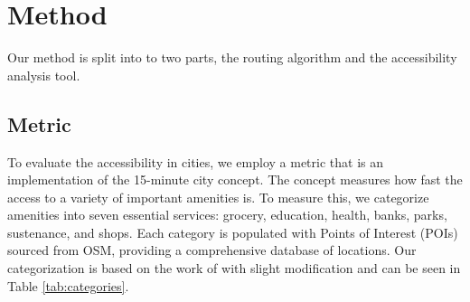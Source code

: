 \clearpage
\section{Method}
\label{sec:method}

Our method is split into to two parts, the routing algorithm and the accessibility analysis tool.

\subsection{Metric}
\label{subsec:metric}

To evaluate the accessibility in cities, we employ a metric that is an implementation of the 15-minute city concept. The concept measures how fast the access to a variety of important amenities is.
To measure this, we categorize amenities into seven essential services: grocery, education, health, banks, parks, sustenance, and shops.
Each category is populated with Points of Interest (POIs) sourced from OSM, providing a comprehensive database of locations.
Our categorization is based on the work of \cite{olivariAreItalianCities2023} with slight modification and can be seen in Table \ref{tab:categories}.

